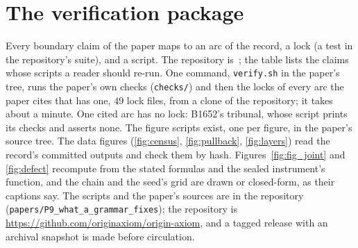 \section{The verification package}\label{app:verify}

Every boundary claim of the paper maps to an arc of the record, a lock (a test in the repository's suite), and a script. The
repository is~\cite{OriginAxiomRepo}; the table lists the claims whose scripts a reader should re-run. One command,
\texttt{verify.sh} in the paper's tree, runs the paper's own checks (\texttt{checks/}) and then the locks of every arc
the paper cites that has one, $49$ lock files, from a clone of the repository; it takes about a minute. One cited arc
has no lock: B1652's tribunal, whose script prints its checks and asserts none.
The figure scripts exist, one per figure, in the paper's source tree. The data figures (\ref{fig:census},
\ref{fig:pullback}, \ref{fig:layers}) read the record's committed outputs and check them by hash. Figures~\ref{fig:fig_joint}
and \ref{fig:defect} recompute from the stated formulas and the sealed instrument's function, and the chain and the seed's
grid are drawn or closed-form, as their captions say. The scripts and the paper's sources are in the
repository (\texttt{papers/P9\_what\_a\_grammar\_fixes}); the repository is \url{https://github.com/originaxiom/origin-axiom}, and a tagged release with an archival snapshot is
made before circulation.

